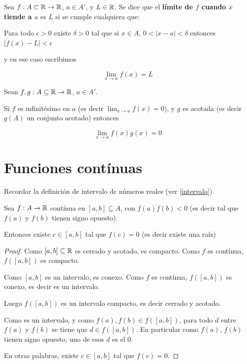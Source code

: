 \begin{definition}[Límite] \label{limite_r}
Sea $f : A \subset \mathbb{R} \to \mathbb{R}$, $ a \in A'$, y $L \in \mathbb{R}$.  Se dice que el \textbf{límite de $f$ cuando $x$ tiende a $a$}  es $L$ si se cumple cualquiera que:

Para todo $\epsilon > 0$ existe $\delta > 0$ tal que si $x \in A$, $0 < |x-a| < \delta$ entonces $|f(x) - L| < \epsilon$

y en ese caso escribimos

$$ \displaystyle \lim_{x \to a} f(x) = L $$
\end{definition}


\begin{theorem} \label{cero_por_acotada}
Sean $f,g:A \subseteq \mathbb{R} \to \mathbb{R}$, $a \in A'$.

Si $f$ es infinitésimo en $a$ (es decir $ \lim_{x \to a} f(x) = 0$), y $g$ es acotada (es decir $g(A)$ un conjunto acotado) entonces

$$ \lim_{x \to a} f(x)g(x) = 0 $$
\end{theorem}


\chapter{Funciones contínuas}

Recordar la definición de intervalo de números reales (ver \ref{intervalo}).


\begin{theorem}[Bolzano]
Sea $f : A \to \mathbb{R}$ contínua en $[a,b] \subseteq A$, con $f(a) f(b) < 0$ (es decir tal que $f(a)$ y $f(b)$ tienen signo opuesto).

Entonces existe $c \in [a,b]$ tal que $f(c) = 0$ (es decir existe una raíz)
\end{theorem}

\begin{proof}
Como $[a,b] \subseteq \mathbb{R}$ es cerrado y acotado, es compacto.  Como $f$ es contínua, $f([a,b])$ es compacto.

Como $[a,b]$ es un intervalo, es conexo.  Como $f$ es contínua, $f([a,b])$ es conexo, es decir es un intervalo.

Luego $f([a,b])$ es un intervalo compacto, es decir cerrado y acotado.

Como es un intervalo, y como $f(a), f(b) \in f([a,b])$, para todo $d$ entre $f(a)$ y $f(b)$ se tiene que $d \in f([a,b])$.  En particular como $f(a)$, $f(b)$ tienen signo opuesto, uno de esos $d$ es el $0$.

En otras palabras, existe $c \in [a,b]$ tal que $f(c) = 0$. 
\end{proof}



